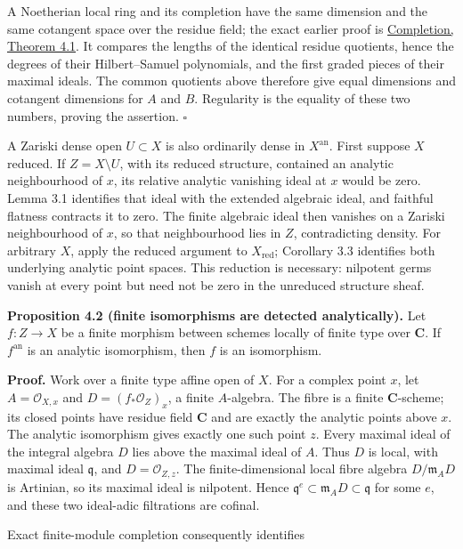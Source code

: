 \documentclass[11pt]{article}
\begin{document}
A Noetherian local ring and its completion have the same dimension and
the same cotangent space over the residue field; the exact earlier proof
is
\href{../AG-CA/AG-CA-19.html\#4-local-dimension-and-regularity}{Completion,
Theorem 4.1}. It compares the lengths of the identical residue
quotients, hence the degrees of their Hilbert--Samuel polynomials, and
the first graded pieces of their maximal ideals. The common quotients
above therefore give equal dimensions and cotangent dimensions for \(A\)
and \(B\). Regularity is the equality of these two numbers, proving the
assertion. \(\square\)

A Zariski dense open \(U\subset X\) is also ordinarily dense in
\(X^{\mathrm{an}}\). First suppose \(X\) reduced. If \(Z=X\setminus U\),
with its reduced structure, contained an analytic neighbourhood of
\(x\), its relative analytic vanishing ideal at \(x\) would be zero.
Lemma 3.1 identifies that ideal with the extended algebraic ideal, and
faithful flatness contracts it to zero. The finite algebraic ideal then
vanishes on a Zariski neighbourhood of \(x\), so that neighbourhood lies
in \(Z\), contradicting density. For arbitrary \(X\), apply the reduced
argument to \(X_{\mathrm{red}}\); Corollary 3.3 identifies both
underlying analytic point spaces. This reduction is necessary: nilpotent
germs vanish at every point but need not be zero in the unreduced
structure sheaf.

\textbf{Proposition 4.2 (finite isomorphisms are detected
analytically).} Let \(f:Z\to X\) be a finite morphism between schemes
locally of finite type over \(\mathbf C\). If \(f^{\mathrm{an}}\) is an
analytic isomorphism, then \(f\) is an isomorphism.

\textbf{Proof.} Work over a finite type affine open of \(X\). For a
complex point \(x\), let \(A=\mathcal O_{X,x}\) and
\(D=(f_*\mathcal O_Z)_x\), a finite \(A\)-algebra. The fibre is a finite
\(\mathbf C\)-scheme; its closed points have residue field \(\mathbf C\)
and are exactly the analytic points above \(x\). The analytic
isomorphism gives exactly one such point \(z\). Every maximal ideal of
the integral algebra \(D\) lies above the maximal ideal of \(A\). Thus
\(D\) is local, with maximal ideal \(\mathfrak q\), and
\(D=\mathcal O_{Z,z}\). The finite-dimensional local fibre algebra
\(D/\mathfrak m_AD\) is Artinian, so its maximal ideal is nilpotent.
Hence \(\mathfrak q^e\subset\mathfrak m_AD\subset\mathfrak q\) for some
\(e\), and these two ideal-adic filtrations are cofinal.

Exact finite-module completion consequently identifies
\end{document}
